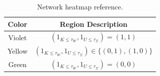 \begin{table}[H]\centering
\caption{Network heatmap reference.}
\label{tab:Network heatmap reference}
\begin{tabular}{|c|c|}
\toprule
\textbf{Color} & \textbf{Region Description} \\
\midrule
Violet & $(1_{K \leq \tau_W},1_{U \leq \tau_\Sigma}) = (1,1)$ \\
Yellow & $(1_{K \leq \tau_W},1_{U \leq \tau_\Sigma}) \in \{(0,1),(1,0)\}$ \\
Green & $(1_{K \leq \tau_W},1_{U \leq \tau_\Sigma}) = (0,0)$ \\
\bottomrule
\end{tabular}
\end{table}
